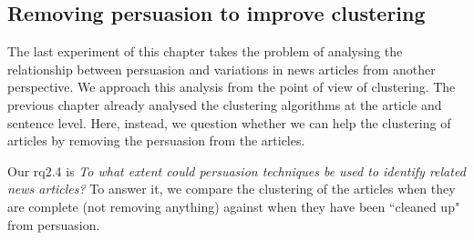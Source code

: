 




\subsection{\statusgreen Removing persuasion to improve clustering}
\label{ssec:lp_relationship_removing}

The last experiment of this chapter takes the problem of analysing the relationship between persuasion and variations in news articles from another perspective.
We approach this analysis from the point of view of clustering.
The previous chapter already analysed the clustering algorithms at the article and sentence level.
Here, instead, we question whether we can help the clustering of articles by removing the persuasion from the articles.

Our \acrshort{rq}2.4 is \emph{To what extent could persuasion techniques be used to identify related news articles?} To answer it, we compare the clustering of the articles when they are complete (not removing anything) against when they have been ``cleaned up" from persuasion.

